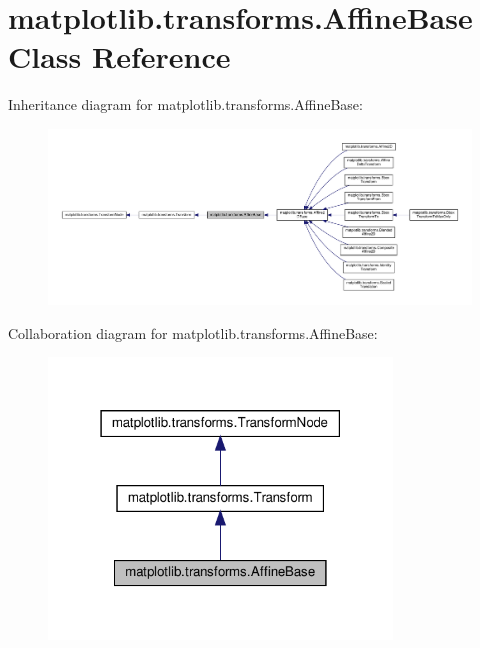 \hypertarget{classmatplotlib_1_1transforms_1_1AffineBase}{}\section{matplotlib.\+transforms.\+Affine\+Base Class Reference}
\label{classmatplotlib_1_1transforms_1_1AffineBase}


Inheritance diagram for matplotlib.\+transforms.\+Affine\+Base\+:
\nopagebreak
\begin{figure}[H]
\begin{center}
\leavevmode
\includegraphics[width=350pt]{classmatplotlib_1_1transforms_1_1AffineBase__inherit__graph}
\end{center}
\end{figure}


Collaboration diagram for matplotlib.\+transforms.\+Affine\+Base\+:
\nopagebreak
\begin{figure}[H]
\begin{center}
\leavevmode
\includegraphics[width=259pt]{classmatplotlib_1_1transforms_1_1AffineBase__coll__graph}
\end{center}
\end{figure}
